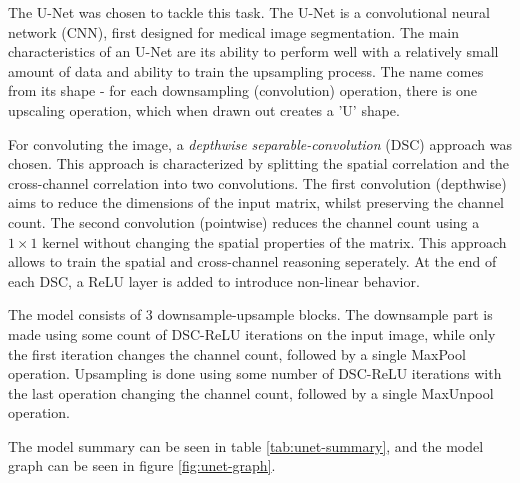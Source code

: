 \documentclass[../main.tex]{subfiles}
\begin{document}
\newcommand{\vertsep}{\unskip\ \vline\ } %

The U-Net was chosen to tackle this task. The U-Net is a convolutional neural network (CNN), first designed for medical image segmentation. The main characteristics of an U-Net are its ability to perform well with a relatively small amount of data and ability to train the upsampling process. The name comes from its shape - for each downsampling (convolution) operation, there is one upscaling operation, which when drawn out creates a 'U' shape.


For convoluting the image, a \emph{depthwise separable-convolution} (DSC) approach was chosen. This approach is characterized by splitting the spatial correlation and the cross-channel correlation into two convolutions.
The first convolution (depthwise) aims to reduce the dimensions of the input matrix, whilst preserving the channel count. The second convolution (pointwise) reduces the channel count using a $1\times 1$ kernel without changing the spatial properties of the matrix. This approach allows to train the spatial and cross-channel reasoning seperately.
At the end of each DSC, a ReLU layer is added to introduce non-linear behavior.

The model consists of 3 downsample-upsample blocks. The downsample part is made using some count of DSC-ReLU iterations on the input image, while only the first iteration changes the channel count, followed by a single MaxPool operation. Upsampling is done using some number of DSC-ReLU iterations with the last operation changing the channel count, followed by a single MaxUnpool operation.

The model summary can be seen in table \ref{tab:unet-summary}, and the model graph can be seen in figure \ref{fig:unet-graph}.
\end{document}
